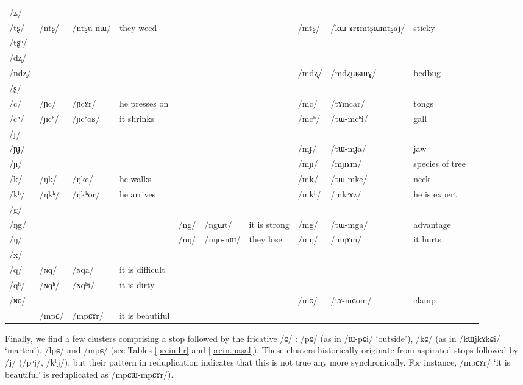 \documentclass[oldfontcommands,oneside,a4paper,11pt]{article}
\newcommand{\ipa}[1]{{\phon/#1/}} %
\newcommand{\deux}[1]{/#1/}
\newcommand{\trois}[1]{/#1/}
\begin{document}
\begin{table}
{\begin{tabular}{l|lll|lll|lll|l}
\ipa{ʑ} 	& 	& 	& 	& 	& 	& 	& 	& 	&  \\
\ipa{tʂ} 	& \deux{ntʂ} 	& \ipa{ntʂu-nɯ} 	& they weed 	& 	& 	& 	& \deux{mtʂ} 	& \ipa{kɯ-ɤrɤmtʂɯmtʂaj} 	& sticky \\
\ipa{tʂʰ} 	& 	& 	& 	& 	& 	& 	& 	& 	&  \\
\ipa{dʐ} 	& 	& 	& 	& 	& 	& 	& 	& 	&  \\
\ipa{ndʐ} 	& 	& 	& 	& 	& 	& 	& \deux{mdʐ} 	& \ipa{mdʐɯɕɯɣ} 	& bedbug \\
\ipa{ʂ} 	& 	& 	& 	& 	& 	& 	& 	& 	&  \\
\ipa{c} 	& \deux{ɲc} 	& \ipa{ɲcɤr} 	& he presses on	& 	& 	& 	& \deux{mc} 	& \ipa{tɤmcar} 	& tongs \\
\ipa{cʰ} 	& \deux{ɲcʰ} 	& \ipa{ɲcʰoʁ} 	& it shrinks	& 	& 	& 	& \deux{mcʰ} 	& \ipa{tɯ-mcʰi} 	& gall \\
\ipa{ɟ} 	& 	& 	& 	& 	& 	& 	& 	& 	&  \\
\ipa{ɲɟ} 	& 	& 	& 	& 	& 	& 	& \deux{mɟ} 	& \ipa{tɯ-mɟa} 	& jaw \\
\ipa{ɲ} 	& 	& 	& 	& 	& 	& 	& \deux{mɲ} 	& \ipa{mɲɤm} 	& species of tree \\
\ipa{k} 	& \deux{ŋk} 	& \ipa{ŋke} 	& he walks	& 	& 	& 	& \deux{mk} 	& \ipa{tɯ-mke} 	& neck \\
\ipa{kʰ} 	& \deux{ŋkʰ} 	& \ipa{ŋkʰor} 	&he arrives 	& 	& 	& 	& \deux{mkʰ} 	& \ipa{mkʰɤz} 	&he is expert  \\
\ipa{g} 	& 	& 	& 	& 	& 	& 	& 	& 	&  \\
\ipa{ŋg} 	& 	& 	& 	& \deux{ng} 	& \ipa{ngɯt} 	&it is strong 	& \deux{mg} 	& \ipa{tɯ-mga} 	& advantage \\
\ipa{ŋ} 	& 	& 	& 	& \deux{nŋ} 	& \ipa{nŋo-nɯ} 	& they lose	& \deux{mŋ} 	& \ipa{mŋɤm} 	& it hurts \\
\ipa{x} 	& 	& 	& 	& 	& 	& 	& 	& 	&  \\
\ipa{q} 	&   \deux{ɴq} 	& \ipa{ɴqa} 	& it is difficult	& 	&  	&	&	&	&\\
\ipa{qʰ}   	&   \deux{ɴqʰ} 	& \ipa{ɴqʰi} 	& it is dirty	& 	&	& 	& 	& 	&\\
\ipa{ɴɢ}  	& 	&	&	& 	& 	& 	& \deux{mɢ} 	& \ipa{tɤ-mɢom} 	&clamp  \\
\midrule
&\trois{mpɕ} &\ipa{mpɕɤr} & it is beautiful\\
\end{tabular}}
\end{table}

Finally, we find a few clusters comprising a stop followed by the fricative \ipa{ɕ} :  \deux{pɕ}  (as in \ipa{ɯ-pɕi}  `outside'),  \deux{kɕ}  (as in \ipa{kɯjkɤkɕi}  `marten'), \ipa{lpɕ} and \ipa{mpɕ} (see Tables \ref{prein.l.r} and  \ref{prein.nasal}). These clusters historically originate from aspirated stops followed by \ipa{j} (\ipa{pʰj}, \ipa{kʰj}), but their pattern in reduplication indicates that this is not true any more synchronically. For instance, \ipa{mpɕɤr} `it is beautiful' is reduplicated as \ipa{mpɕɯ-mpɕɤr}).
\end{document}
